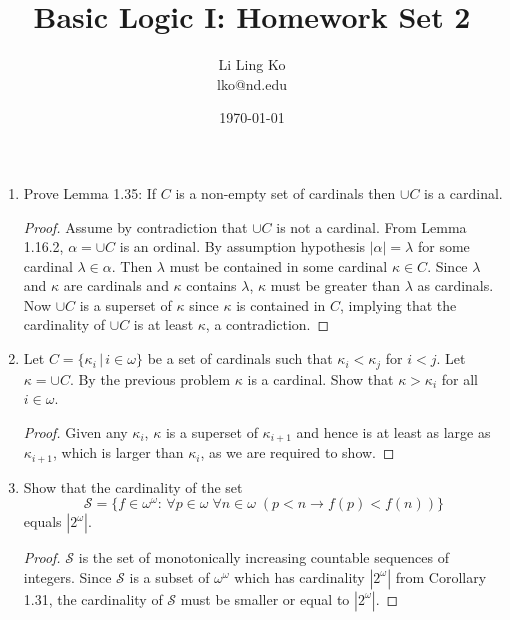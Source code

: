 \documentclass{article}
\begin{document}
\title{Basic Logic I: Homework Set 2}
\author{Li Ling Ko\\ lko@nd.edu}
\date{\today}
\maketitle

\begin{enumerate}
  \item Prove Lemma 1.35: If $C$ is a non-empty set of cardinals then
    $\cup C$ is a cardinal.

    \begin{proof}
      Assume by contradiction that $\cup C$ is not a cardinal. 
      From Lemma 1.16.2, $\alpha=\cup C$ is an ordinal. By assumption
      hypothesis $|\alpha|=\lambda$ for some cardinal $\lambda\in\alpha$.
      Then $\lambda$ must be contained in some cardinal $\kappa\in C$.
      Since $\lambda$ and $\kappa$ are cardinals and $\kappa$ contains
      $\lambda$, $\kappa$ must be greater than $\lambda$ as cardinals. Now
      $\cup C$ is a superset of $\kappa$ since $\kappa$ is contained in
      $C$, implying that the cardinality of $\cup C$ is at least $\kappa$,
      a contradiction.
    \end{proof}

  \item Let $C=\{\kappa_i\,|\, i\in\omega\}$ be a set of cardinals such
    that $\kappa_i<\kappa_j$ for $i<j$. Let $\kappa=\cup C$. By the
    previous problem $\kappa$ is a cardinal. Show that $\kappa>\kappa_i$
    for all $i\in\omega$.

    \begin{proof}
      Given any $\kappa_i$, $\kappa$ is a superset of $\kappa_{i+1}$ and
      hence is at least as large as $\kappa_{i+1}$, which is larger than
      $\kappa_i$, as we are required to show.
    \end{proof}

  \item Show that the cardinality of the set
    \begin{equation*}
      \mathcal{S}=\{f\in\omega^\omega:\, \forall p\in\omega\; \forall
      n\in\omega\; (p<n\rightarrow f(p)<f(n))\}
    \end{equation*}
    equals $|2^\omega|$.

    \begin{proof}
      $\mathcal{S}$ is the set of monotonically increasing countable
      sequences of integers. Since $\mathcal{S}$ is a subset of
      $\omega^\omega$ which has cardinality $|2^\omega|$ from Corollary
      1.31, the cardinality of $\mathcal{S}$ must be smaller or equal to
      $|2^\omega|$.
    \end{proof}
\end{enumerate}
\end{document}
